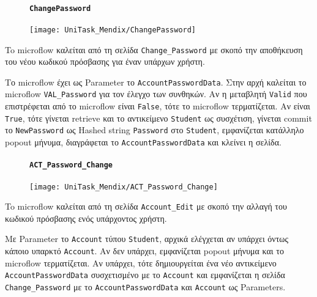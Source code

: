                 \begin{figure}[H] \noindent
                    \paragraph{\texttt{ChangePassword}}
                    \begin{center}
                        \texttt{[image: UniTask\_Mendix/ChangePassword]}
                    \end{center}
                \end{figure}

                    To microflow καλείται από τη σελίδα \texttt{Change\_Password} με σκοπό την αποθήκευση του νέου κωδικού πρόσβασης για έναν υπάρχων χρήστη.

                    Το microflow έχει ως Parameter το \texttt{AccountPasswordData}. Στην αρχή καλείται το microflow \texttt{VAL\_Password} για τον έλεγχο των συνθηκών. Αν η μεταβλητή \texttt{Valid} που επιστρέφεται από το microflow είναι \texttt{False}, τότε το microflow τερματίζεται. Αν είναι \texttt{True}, τότε γίνεται retrieve και το αντικείμενο \texttt{Student} ως συσχέτιση, γίνεται commit το \texttt{NewPassword} ως Hashed string \texttt{Password} στο \texttt{Student}, εμφανίζεται κατάλληλο popout μήνυμα, διαγράφεται το \texttt{AccountPasswordData} και κλείνει η σελίδα.

                \begin{figure}[H] \noindent
                    \paragraph{\texttt{ACT\_Password\_Change}}
                    \begin{center}
                        \texttt{[image: UniTask\_Mendix/ACT\_Password\_Change]}
                    \end{center}
                \end{figure}

                    To microflow καλείται από τη σελίδα \texttt{Account\_Edit} με σκοπό την αλλαγή του κωδικού πρόσβασης ενός υπάρχοντος χρήστη.

                    Με Parameter το \texttt{Account} τύπου \texttt{Student}, αρχικά ελέγχεται αν υπάρχει όντως κάποιο υπαρκτό \texttt{Account}. Αν δεν υπάρχει, εμφανίζεται popout μήνυμα και το microflow τερματίζεται. Αν υπάρχει, τότε δημιουργείται ένα νέο αντικείμενο \texttt{AccountPasswordData} συσχετισμένο με το \texttt{Account} και εμφανίζεται η σελίδα \texttt{Change\_Password} με το \linebreak \texttt{AccountPasswordData} και \texttt{Account} ως Parameters.

